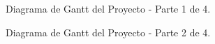 \documentclass[
11pt, %
]{charter}
\begin{document}
\begin{figure}[htpb]
\centering
{}
\caption{Diagrama de Gantt del Proyecto - Parte 1 de 4.}
\label{fig:diagBloques}
\end{figure}

\vspace{15px}

\begin{figure}[htpb]
\centering
{}
\caption{Diagrama de Gantt del Proyecto - Parte 2 de 4.}
\label{fig:diagBloques}
\end{figure}
\end{document}
